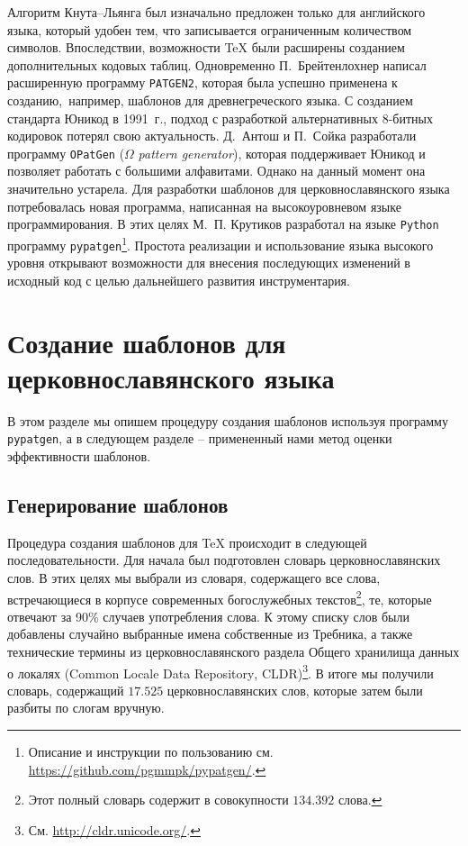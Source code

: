 \documentclass[12pt,a4paper,oneside]{extarticle}
\begin{document}
Алгоритм Кнута--Льянга был изначально предложен только для английского языка, который удобен тем, что записывается ограниченным количеством символов. Впоследствии, возможности \TeX{} были расширены созданием дополнительных кодовых таблиц\autocite[Кодировка \textenglish{Extended \TeX{} Font Encoding Scheme} (ET). См. ][]{ferguson1990}. Одновременно П.~Брейтенлохнер написал расширенную программу \verb+PATGEN2+\autocite[См. описание в пособии ][]{patgen2}, которая была успешно применена к созданию, например, шаблонов для древнегреческого языка\autocite[][]{haralambous1992}. С созданием стандарта Юникод в 1991~г., подход с разработкой альтернативных 8-битных кодировок потерял свою актуальность. Д.~Антош и  П.~Сойка разработали программу \texttt{OPatGen} ($\Omega$ \emph{pattern generator}), которая поддерживает Юникод и позволяет работать с большими алфавитами\autocite[][]{sojka2003}. Однако на данный момент она значительно устарела. Для разработки шаблонов для церковнославянского языка потребовалась новая программа, написанная на  высокоуровневом языке программирования. В этих целях М.~П. Крутиков разработал на языке \verb+Python+ программу \verb+pypatgen+\footnote{Описание и инструкции по пользованию см. \url{https://github.com/pgmmpk/pypatgen/}.}. Простота реализации и использование языка высокого уровня открывают возможности для внесения последующих изменений в исходный код с целью дальнейшего развития инструментария.

\section{Создание шаблонов для церковнославянского языка}

В этом разделе мы опишем процедуру создания шаблонов используя программу \verb+pypatgen+, а в следующем разделе -- примененный нами метод оценки эффективности шаблонов.

\subsection{Генерирование шаблонов}

Процедура создания шаблонов для \TeX{} происходит в следующей последовательности. Для начала был подготовлен словарь церковнославянских слов. В этих целях мы выбрали из словаря, содержащего все слова, встречающиеся в корпусе современных богослужебных текстов\footnote{Этот полный словарь содержит в совокупности $134.392$ слова.}, те, которые отвечают за 90\% случаев употребления слова. К этому списку слов были добавлены случайно выбранные имена собственные из Требника, а также технические термины из церковнославянского раздела Общего хранилища данных о локалях (\textenglish{Common Locale Data Repository}, CLDR)\footnote{См. \url{http://cldr.unicode.org/}.}. В итоге мы получили словарь, содержащий $17.525$ церковнославянских слов, которые затем были разбиты по слогам вручную.
\end{document}
